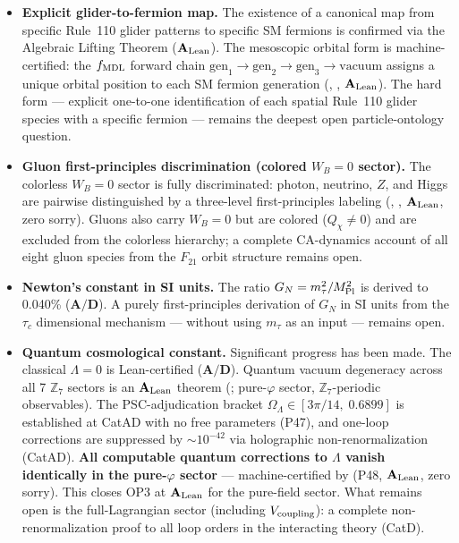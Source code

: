 \begin{itemize}[leftmargin=1.5em,itemsep=0.25em]
  \item \textbf{Explicit glider-to-fermion map.}
    The existence of a canonical map from specific Rule~110 glider patterns to
    specific SM fermions is confirmed via the Algebraic Lifting Theorem
    ($\mathbf{A}_{\rm Lean}$).  The mesoscopic orbital form is machine-certified:
    the $f_{\rm MDL}$ forward chain $\mathrm{gen}_1 \to \mathrm{gen}_2 \to
    \mathrm{gen}_3 \to \mathrm{vacuum}$ assigns a unique orbital position to each
    SM fermion generation (,
    , $\mathbf{A}_{\rm Lean}$).  The hard form ---
    explicit one-to-one identification of each spatial Rule~110 glider species
    with a specific fermion --- remains the deepest open particle-ontology question.

  \item \textbf{Gluon first-principles discrimination (colored $W_B{=}0$ sector).}
    The colorless $W_B{=}0$ sector is fully discriminated: photon, neutrino, $Z$,
    and Higgs are pairwise distinguished by a three-level first-principles labeling
    (,
    , $\mathbf{A}_{\rm Lean}$, zero sorry).
    Gluons also carry $W_B = 0$ but are colored ($Q_\chi \neq 0$) and are excluded
    from the colorless hierarchy; a complete CA-dynamics account of all eight gluon
    species from the $F_{21}$ orbit structure remains open.

  \item \textbf{Newton's constant in SI units.}
    The ratio $G_N = m_\tau^2/M_{\rm Pl}^2$ is derived to 0.040\% ($\mathbf{A/D}$).
    A purely first-principles derivation of $G_N$ in SI units from the $\tau_c$
    dimensional mechanism --- without using $m_\tau$ as an input --- remains open.

  \item \textbf{Quantum cosmological constant.}
    Significant progress has been made.
    The classical $\Lambda = 0$ is Lean-certified ($\mathbf{A/D}$).
    Quantum vacuum degeneracy across all 7 $\mathbb{Z}_7$ sectors is an
    $\mathbf{A}_{\rm Lean}$ theorem (;
    pure-$\varphi$ sector, $\mathbb{Z}_7$-periodic observables).
    The PSC-adjudication bracket $\Omega_\Lambda \in [3\pi/14,\;0.6899]$ is
    established at CatAD with no free parameters (P47), and one-loop corrections
    are suppressed by $\sim 10^{-42}$ via holographic non-renormalization (CatAD).
    \textbf{All computable quantum corrections to $\Lambda$ vanish identically in
    the pure-$\varphi$ sector} --- machine-certified by
     (P48, $\mathbf{A}_{\rm Lean}$,
    zero sorry).  This closes OP3 at $\mathbf{A}_{\rm Lean}$ for the pure-field
    sector.  What remains open is the full-Lagrangian sector (including
    $V_{\rm coupling}$): a complete non-renormalization proof to all loop orders
    in the interacting theory (CatD).

\end{itemize}

